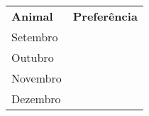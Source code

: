 \documentclass{article}
\begin{document}
\renewcommand\MyCirc{\raisebox{-2pt}{\tikz\draw[fill,orange] circle (1.5ex);}\,}
\renewcommand\MySemi{\raisebox{-2pt}{\tikz\draw[fill,orange] (0,0) arc (90:360/4*3:1.5ex);}\,}
\newcommand\MyQuarter{\raisebox{-2pt}{\tikz[scale=.25] \fill[orange] (0,0) -- (-1,0) arc (180:270:1) -- cycle;}\,}
\newcommand\MyThreeQuarter{\raisebox{-2pt}{\tikz[scale=.25] \fill[orange] (0,0) -- (1,0) arc (0:-90*3:1) -- cycle;}\,}



\begin{table}[!h]
\begin{center}
\begin{tabular}{p{20ex}p{35ex}}
\textbf{Animal}   & \textbf{Preferência}\\
Setembro     & \MyCirc \MySemi\\
Outubro & \MyCirc \MyCirc \MyCirc \MyQuarter \\
Novembro  & \MyCirc \MyCirc \MyThreeQuarter\\
Dezembro  & \MyCirc\MyCirc\MyCirc\MyCirc
\end{tabular}
\end{center}
\end{table}
\end{document}
